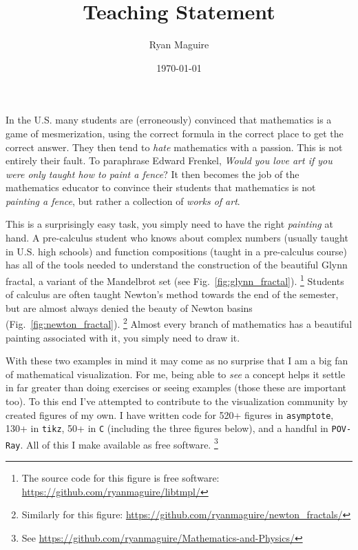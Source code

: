 \documentclass{article}
\title{Teaching Statement}
\author{Ryan Maguire}
\date{\today}
\begin{document}
    \maketitle
    In the U.S. many students are (erroneously) convinced that
    mathematics is a game of mesmerization, using the correct formula in the
    correct place to get the correct answer. They then tend to \textit{hate}
    mathematics with a passion. This is not entirely their fault. To paraphrase
    Edward Frenkel,
    \textit{Would you love art if you were only taught how to paint a fence}?
    It then becomes the job of the mathematics educator to convince their
    students that mathematics is not \textit{painting a fence}, but rather
    a collection of \textit{works of art}.
    \par\hfill\par
    This is a surprisingly easy task, you simply need to have the right
    \textit{painting} at hand. A pre-calculus student who knows about complex
    numbers (usually taught in U.S. high schools) and function compositions
    (taught in a pre-calculus course) has all of the tools needed to understand
    the construction of the beautiful Glynn fractal, a variant of the
    Mandelbrot set (see Fig.~\ref{fig:glynn_fractal}).%
    \footnote{%
        The source code for this figure is free software:
        \url{https://github.com/ryanmaguire/libtmpl/}
    }
    Students of calculus are often taught Newton's method towards the end
    of the semester, but are almost always denied the beauty of Newton basins
    (Fig.~\ref{fig:newton_fractal}).%
    \footnote{%
        Similarly for this figure:
        \url{https://github.com/ryanmaguire/newton_fractals/}
    }
    Almost every branch of mathematics has a beautiful painting associated with
    it, you simply need to draw it.
    \par\hfill\par
    With these two examples in mind
    it may come as no surprise that I am a big fan of mathematical
    visualization. For me, being able to \textit{see} a concept helps it settle
    in far greater than doing exercises or seeing examples (those these are
    important too). To this end I've attempted to contribute to the
    visualization community by created figures of my own. I have written
    code for 520+ figures in \texttt{asymptote}, 130+ in \texttt{tikz},
    50+ in \texttt{C} (including the three figures below), and a handful in
    \texttt{POV-Ray}. All of this I make available as free software.%
    \footnote{%
        See
        \url{https://github.com/ryanmaguire/Mathematics-and-Physics/}
    }
\end{document}
